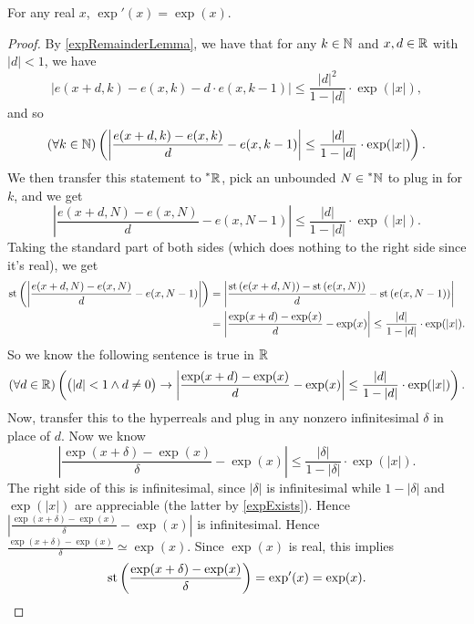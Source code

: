 \begin{thm}
    For any real $x$, $\exp'(x) = \exp(x)$.
\end{thm}

\begin{proof}
    By \autoref{expRemainderLemma}, we have that for any $k \in \mathbb{N}$ and $x, d \in \mathbb{R}$ with $|d| < 1$, we have
    \[ 
    |e(x + d, k) - e(x, k) - d\cdot e(x, k-1)| \leq \frac{|d|^2}{1 - |d|} \cdot \exp(|x|), 
    \]
    and so
    \[
    (\forall k \in \mathbb{N})\left(\left|\frac{e(x + d, k) - e(x, k)}{d} - e(x, k - 1)\right| \leq \frac{|d|}{1 - |d|} \cdot \exp(|x|)\right).
    \]
    We then transfer this statement to $\prescript{*}{}{\mathbb{R}}$, pick an unbounded $N \in \prescript{*}{}{\mathbb{N}}$ to plug in for $k$, and we get
    \[
    \left|\frac{e(x + d, N) - e(x, N)}{d} - e(x, N - 1)\right| \leq \frac{|d|}{1-|d|} \cdot \exp(|x|).
    \]
    Taking the standard part of both sides (which does nothing to the right side since it's real), we get
    \begin{align*}
    \operatorname{st}\left(\left|\frac{e(x + d, N) - e(x, N)}{d} - e(x, N - 1)\right|\right) &= \left|\frac{\operatorname{st}\left(e(x + d, N)\right) - \operatorname{st}\left(e(x, N)\right)}{d} - \operatorname{st}\left(e(x, N - 1)\right)\right| \\
        &= \left|\frac{\exp(x + d) - \exp(x)}{d} - \exp(x)\right| \leq \frac{|d|}{1-|d|} \cdot \exp(|x|).
    \end{align*}
    So we know the following sentence is true in $\mathbb{R}$
    \[
    (\forall d \in \mathbb{R})\left(\big(|d| < 1 \land d \neq 0\big) \to \left|\frac{\exp(x + d) - \exp(x)}{d} - \exp(x)\right| \leq \frac{|d|}{1-|d|} \cdot \exp(|x|)\right).
    \]
    Now, transfer this to the hyperreals and plug in any nonzero infinitesimal $\delta$ in place of $d$. Now we know
    \[
    \left|\frac{\exp(x + \delta) - \exp(x)}{\delta} - \exp(x)\right| \leq \frac{|\delta|}{1-|\delta|} \cdot \exp(|x|).
    \]
    The right side of this is infinitesimal, since $|\delta|$ is infinitesimal while $1 - |\delta|$ and $\exp(|x|)$ are appreciable (the latter by \autoref{expExists}). Hence $\left|\frac{\exp(x + \delta) - \exp(x)}{\delta} - \exp(x)\right|$ is infinitesimal. Hence $\frac{\exp(x + \delta) - \exp(x)}{\delta} \simeq \exp(x)$. Since $\exp(x)$ is real, this implies
    \[
    \operatorname{st}\left(\frac{\exp(x + \delta) - \exp(x)}{\delta}\right) = \exp'(x) = \exp(x).
    \]
\end{proof}